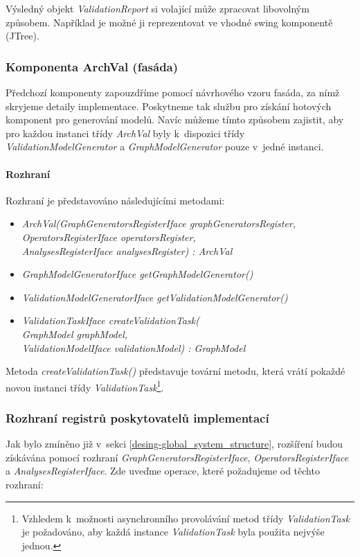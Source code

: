 Výsledný objekt \emph{ValidationReport} si volající může zpracovat libovolným způsobem. Například je možné ji reprezentovat ve vhodné swing komponentě (JTree).

\subsubsection{Komponenta ArchVal (fasáda)}
Předchozí komponenty zapouzdříme pomocí návrhového vzoru fasáda, za nímž skryjeme detaily implementace. Poskytneme tak službu pro získání hotových komponent pro generování modelů. Navíc můžeme tímto způsobem zajistit, aby pro každou instanci třídy \emph{ArchVal} byly k~dispozici třídy \emph{ValidationModelGenerator} a \emph{GraphModelGenerator} pouze v~jedné instanci.

\paragraph{Rozhraní} Rozhraní je představováno následujícími metodami:
\begin{itemize}
\item \emph{ArchVal(GraphGeneratorsRegisterIface graphGeneratorsRegister, \\
OperatorsRegisterIface operatorsRegister, \\
AnalysesRegisterIface analysesRegister) : ArchVal}
\item \emph{GraphModelGeneratorIface getGraphModelGenerator()}
\item \emph{ValidationModelGeneratorIface getValidationModelGenerator()}
\item \emph{ValidationTaskIface createValidationTask(\\
    GraphModel graphModel, \\
    ValidationModelIface validationModel) : GraphModel}
\end{itemize}

Metoda \emph{createValidationTask()} představuje tovární metodu, která vrátí pokaždé novou instanci třídy \emph{ValidationTask}\footnote{Vzhledem k~možnosti asynchronního provolávání metod třídy \emph{ValidationTask} je požadováno, aby každá instance \emph{ValidationTask} byla použita nejvýše jednou.}.

\subsubsection{Rozhraní registrů poskytovatelů implementací}

Jak bylo zmíněno již v~sekci \ref{desing-global_system_structure}, rozšíření budou získávána pomocí rozhraní \emph{GraphGeneratorsRegisterIface}, \emph{OperatorsRegisterIface} a \emph{AnalysesRegisterIface}. Zde uveďme operace, které požadujeme od těchto rozhraní:

